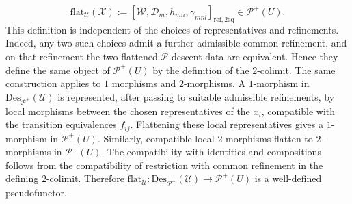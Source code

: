 \documentclass[reqno]{amsart}
\theoremstyle{definition}
\theoremstyle{remark}
\begin{document}
\begin{equation}
\text{flat}_{\mathcal U}(\mathcal X) :=\left[\mathcal{W},\mathcal D_m,h_{mn},\gamma_{mnl}\right]_{\mathrm{ref},2\mathrm{eq}}\in \mathscr P^+(U).
\end{equation}
This definition is independent of the choices of representatives and refinements. Indeed, any two such choices admit a further admissible common refinement, and on that refinement the two flattened $\mathscr P$-descent data are equivalent. Hence they define the same object of $\mathscr P^+(U)$ by the definition of the $2$-colimit. The same construction applies to $1$ morphisms and $2$-morphisms. A $1$-morphism in $\text{Des}_{\mathscr P^+}(\mathcal U)$ is represented, after passing to suitable admissible refinements, by local morphisms between the chosen representatives of the $x_i$, compatible with the transition equivalences $f_{ij}$. Flattening these local representatives gives a $1$-morphism in $\mathscr P^+(U)$. Similarly, compatible local $2$-morphisms flatten to $2$-morphisms in $\mathscr P^+(U)$. The compatibility with identities and compositions follows from the compatibility of restriction with common refinement in the defining $2$-colimit. Therefore $\text{flat}_{\mathcal U}:\text{Des}_{\mathscr P^+}(\mathcal U)\longrightarrow\mathscr P^+(U)$ is a well-defined pseudofunctor.
\end{document}

